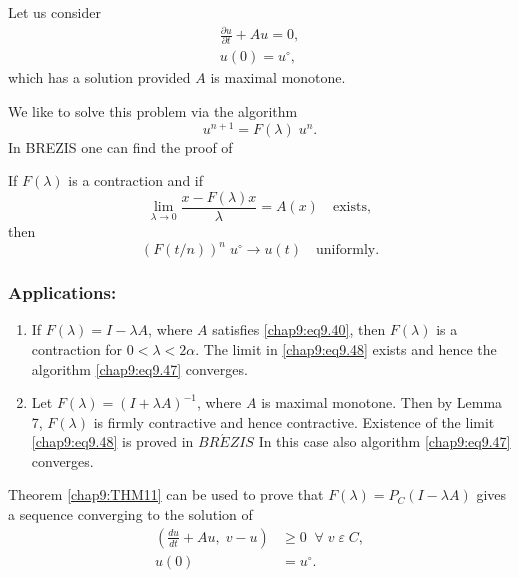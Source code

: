 \begin{exam}\label{chap9:exm7}
Let us consider
\begin{equation}
\begin{aligned}
\frac{\partial u}{\partial t}+Au=0,\label{chap9:eq9.46}\\
u(0)=u^\circ,
\end{aligned}
\end{equation}
which has a solution provided $A$ is maximal monotone.

We like to solve this problem via the algorithm
\begin{equation}\label{chap9:eq9.47}
u^{n+1}=F(\lambda)\;u^n.
\end{equation}
In BREZIS \cite{key4} one can find the proof of 
\end{exam}

\begin{THM}\label{chap9:THM11}
If $F(\lambda)$ is a contraction and if 
\begin{equation}\label{chap9:eq9.48}
\lim\limits_{\lambda\to 0}\frac{x-F(\lambda)x}{\lambda}=A(x)\quad
\text{exists}, 
\end{equation}
then\pageoriginale
$$
(F(t/n))^n\;u^\circ \to u(t)\quad\text{uniformly}.
$$
\end{THM}

\subsubsection{\bf Applications:}
\begin{enumerate}
\item If $F(\lambda)=I-\lambda A$, where $A$ satisfies
  \eqref{chap9:eq9.40}, then $F(\lambda)$ is a contraction for
$0<\lambda <2\alpha$. The limit in \eqref{chap9:eq9.48} exists and
hence the algorithm \eqref{chap9:eq9.47} converges.
\item Let $F(\lambda)=(I+\lambda A)^{-1}$, where $A$ is maximal
monotone. Then by Lemma 7, $F(\lambda)$ is firmly
contractive and hence contractive. Existence of the limit
\eqref{chap9:eq9.48} is proved in $BR\acute{E}ZIS$ \cite{key4} In this case
also algorithm \eqref{chap9:eq9.47} converges.
\end{enumerate}

\begin{REM}\label{chap9:rem5}
Theorem \ref{chap9:THM11} can be used to prove that
$F(\lambda)=P_C(I-\lambda A)$ gives a sequence converging to the
solution of 
\begin{align*}
\left(\frac{du}{dt}+Au,\;v-u\right) &\geq 0\; \; \forall \;v \;\varepsilon
\;C,\\
u(0) &= u^\circ.
\end{align*}
\end{REM}

